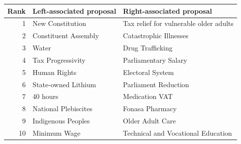 \begin{tabular}{r p{5cm} p{5cm}}
\toprule
Rank & Left-associated proposal & Right-associated proposal \\
\midrule
1 & New Constitution & Tax relief for vulnerable older adults \\
2 & Constituent Assembly & Catastrophic Illnesses \\
3 & Water & Drug Trafficking \\
4 & Tax Progressivity & Parliamentary Salary \\
5 & Human Rights & Electoral System \\
6 & State-owned Lithium & Parliament Reduction \\
7 & 40 hours & Medication VAT \\
8 & National Plebiscites & Fonasa Pharmacy \\
9 & Indigenous Peoples & Older Adult Care \\
10 & Minimum Wage & Technical and Vocational Education \\
\bottomrule
\end{tabular}
